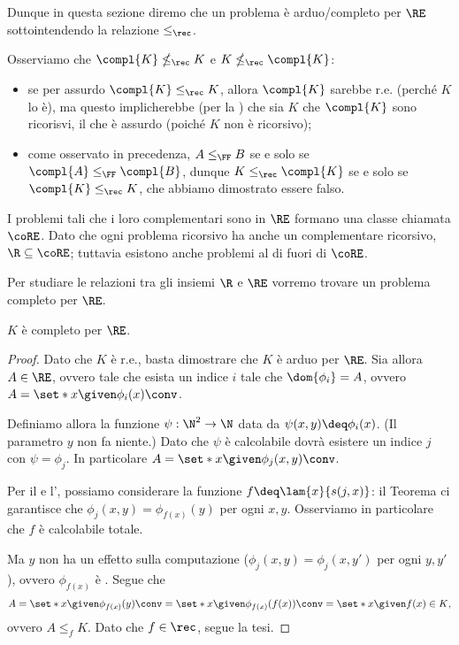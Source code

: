 Dunque in questa sezione diremo che un problema è arduo/completo per $\RE$ sottointendendo la relazione $\leq_\rec$.   

\begin{remark} 
    Osserviamo che $\compl{K} \nleq_\rec K$ e $K \nleq_\rec \compl{K}$: \begin{itemize}
        \item se per assurdo $\compl{K} \leq_\rec K$, allora $\compl{K}$ sarebbe r.e. (perché $K$ lo è), ma questo implicherebbe (per la ) che sia $K$ che $\compl{K}$ sono ricorisvi, il che è assurdo (poiché $K$ non è ricorsivo);
        \item come osservato in precedenza, $A \leq_\FF B$ se e solo se $\compl{A} \leq_\FF \compl{B}$, dunque $K \leq_\rec \compl{K}$ se e solo se $\compl{K} \leq_\rec K$, che abbiamo dimostrato essere falso.   
    \end{itemize}  
\end{remark}

I problemi tali che i loro complementari sono in $\RE$ formano una classe chiamata $\coRE$. Dato che ogni problema ricorsivo ha anche un complementare ricorsivo, $\R \subseteq \coRE$; tuttavia esistono anche problemi al di fuori di $\coRE$.   

\medskip

Per studiare le relazioni tra gli insiemi $\R$ e $\RE$ vorremo trovare un problema completo per $\RE$.

\begin{theorem}
    {}{}
    $K$ è completo per $\RE$. 
\end{theorem}
\begin{proof}
    Dato che $K$ è r.e., basta dimostrare che $K$ è arduo per $\RE$. Sia allora $A \in \RE$, ovvero tale che esista un indice $i$ tale che $\dom{\phi_i} = A$, ovvero $A = \set*{x \given \phi_i(x)\conv}$.
    
    Definiamo allora la funzione $\psi : \N^2 \to \N$ data da $\psi(x, y) \deq \phi_i(x)$. (Il parametro $y$ non fa niente.)
    Dato che $\psi$ è calcolabile dovrà esistere un indice $j$ con $\psi = \phi_j$. In particolare $A = \set*{x \given \phi_j(x, y)\conv}$.
    
    Per il  e l', possiamo considerare la funzione $f \deq \lam{x}{s(j, x)}$: il Teorema ci garantisce che $\phi_j(x, y) = \phi_{f(x)}(y)$ per ogni $x, y$. Osserviamo in particolare che $f$ è calcolabile totale.

    Ma $y$ non ha un effetto sulla computazione ($\phi_j(x, y) = \phi_j(x, y')$ per ogni $y, y'$), ovvero $\phi_{f(x)}$ è . Segue che \[
        A = \set*{x \given \phi_{f(x)}(y)\conv} = \set*{x \given \phi_{f(x)}(f(x))\conv} = \set*{x \given f(x) \in K},
    \] ovvero $A \leq_f K$. Dato che $f \in \rec$, segue la tesi.
\end{proof}

